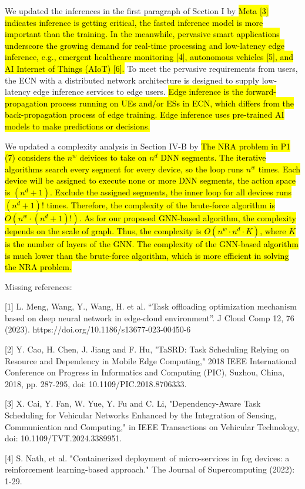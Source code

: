 \documentclass{ar2rc}
\newcommand{\highlight}[1]{\sethlcolor{yellow!50}\hl{#1}}
\begin{document}
We updated the inferences in the first paragraph of Section I by \highlight{Meta [3] indicates inference is getting critical, the fasted inference model is more important than the training. In the meanwhile, pervasive smart applications underscore the growing demand for real-time processing and low-latency edge inference, e.g., emergent healthcare monitoring [4], autonomous vehicles [5], and AI Internet of Things (AIoT) [6].} To meet the pervasive requirements from users, the ECN with a distributed network architecture is designed to supply low-latency edge inference services to edge users. 
\highlight{Edge inference is the forward-propagation process running on UEs and/or ESs in ECN, which differs from the back-propagation process of edge training. Edge inference uses pre-trained AI models to make predictions or decisions. }

We updated a complexity analysis in Section IV-B by \hl{The NRA problem in P1 (7) considers the $n^{w}$ deivices to take on $n^{d}$ DNN segments. The iterative algorithms search every segment for every device, so the loop runs $n^{w}$ times. Each device will be assigned to execute none or more DNN segments, the action space is $(n^{d}+1)$. Exclude the assigned segments, the inner loop for all devices runs $(n^{d}+1)!$ times. Therefore, the complexity of the brute-force algorithm is $O(n^{w} \cdot (n^{d}+1)!)$. As for our proposed GNN-based algorithm, the complexity depends on the scale of graph. Thus, the complexity is $O(n^{w} \cdot n^{d} \cdot K)$, where $K$ is the number of layers of the GNN. The complexity of the GNN-based algorithm is much lower than the brute-force algorithm, which is more efficient in solving the NRA problem.}


\begin{tcolorbox}[
   title={Reviewer 2: Comment 5},
   colback=gray!10,%
   colframe=black,%
   width=\linewidth,%
   arc=1mm, auto outer arc,
   boxrule=0.5pt,
]
Missing references:

[1]	L. Meng, Wang, Y., Wang, H. et al. “Task offloading optimization mechanism based on deep neural network in edge-cloud environment”. J Cloud Comp 12, 76 (2023). https://doi.org/10.1186/s13677-023-00450-6

[2]	Y. Cao, H. Chen, J. Jiang and F. Hu, "TaSRD: Task Scheduling Relying on Resource and Dependency in Mobile Edge Computing," 2018 IEEE International Conference on Progress in Informatics and Computing (PIC), Suzhou, China, 2018, pp. 287-295, doi: 10.1109/PIC.2018.8706333.

[3]	X. Cai, Y. Fan, W. Yue, Y. Fu and C. Li, "Dependency-Aware Task Scheduling for Vehicular Networks Enhanced by the Integration of Sensing, Communication and Computing," in IEEE Transactions on Vehicular Technology, doi: 10.1109/TVT.2024.3389951.

[4]	S. Nath, et al. "Containerized deployment of micro-services in fog devices: a reinforcement learning-based approach." The Journal of Supercomputing (2022): 1-29.

\end{tcolorbox}
\end{document}
